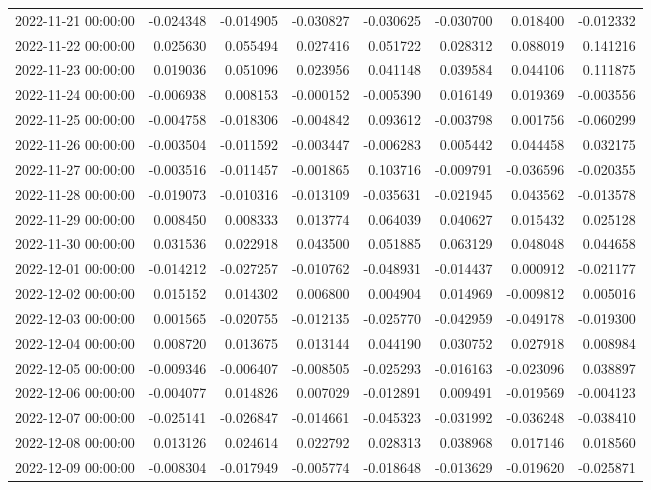 \begin{tabular}{lrrrrrrr}
2022-11-21 00:00:00 & -0.024348 & -0.014905 & -0.030827 & -0.030625 & -0.030700 & 0.018400 & -0.012332 \\
2022-11-22 00:00:00 & 0.025630 & 0.055494 & 0.027416 & 0.051722 & 0.028312 & 0.088019 & 0.141216 \\
2022-11-23 00:00:00 & 0.019036 & 0.051096 & 0.023956 & 0.041148 & 0.039584 & 0.044106 & 0.111875 \\
2022-11-24 00:00:00 & -0.006938 & 0.008153 & -0.000152 & -0.005390 & 0.016149 & 0.019369 & -0.003556 \\
2022-11-25 00:00:00 & -0.004758 & -0.018306 & -0.004842 & 0.093612 & -0.003798 & 0.001756 & -0.060299 \\
2022-11-26 00:00:00 & -0.003504 & -0.011592 & -0.003447 & -0.006283 & 0.005442 & 0.044458 & 0.032175 \\
2022-11-27 00:00:00 & -0.003516 & -0.011457 & -0.001865 & 0.103716 & -0.009791 & -0.036596 & -0.020355 \\
2022-11-28 00:00:00 & -0.019073 & -0.010316 & -0.013109 & -0.035631 & -0.021945 & 0.043562 & -0.013578 \\
2022-11-29 00:00:00 & 0.008450 & 0.008333 & 0.013774 & 0.064039 & 0.040627 & 0.015432 & 0.025128 \\
2022-11-30 00:00:00 & 0.031536 & 0.022918 & 0.043500 & 0.051885 & 0.063129 & 0.048048 & 0.044658 \\
2022-12-01 00:00:00 & -0.014212 & -0.027257 & -0.010762 & -0.048931 & -0.014437 & 0.000912 & -0.021177 \\
2022-12-02 00:00:00 & 0.015152 & 0.014302 & 0.006800 & 0.004904 & 0.014969 & -0.009812 & 0.005016 \\
2022-12-03 00:00:00 & 0.001565 & -0.020755 & -0.012135 & -0.025770 & -0.042959 & -0.049178 & -0.019300 \\
2022-12-04 00:00:00 & 0.008720 & 0.013675 & 0.013144 & 0.044190 & 0.030752 & 0.027918 & 0.008984 \\
2022-12-05 00:00:00 & -0.009346 & -0.006407 & -0.008505 & -0.025293 & -0.016163 & -0.023096 & 0.038897 \\
2022-12-06 00:00:00 & -0.004077 & 0.014826 & 0.007029 & -0.012891 & 0.009491 & -0.019569 & -0.004123 \\
2022-12-07 00:00:00 & -0.025141 & -0.026847 & -0.014661 & -0.045323 & -0.031992 & -0.036248 & -0.038410 \\
2022-12-08 00:00:00 & 0.013126 & 0.024614 & 0.022792 & 0.028313 & 0.038968 & 0.017146 & 0.018560 \\
2022-12-09 00:00:00 & -0.008304 & -0.017949 & -0.005774 & -0.018648 & -0.013629 & -0.019620 & -0.025871 \\

\end{tabular}

